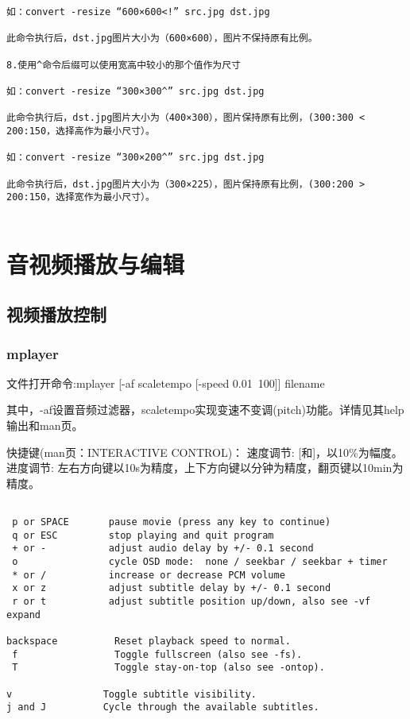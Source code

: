 \begin{verbatim}
如：convert -resize “600×600<!” src.jpg dst.jpg

此命令执行后，dst.jpg图片大小为（600×600），图片不保持原有比例。

8.使用^命令后缀可以使用宽高中较小的那个值作为尺寸

如：convert -resize “300×300^” src.jpg dst.jpg

此命令执行后，dst.jpg图片大小为（400×300），图片保持原有比例，(300:300 < 200:150，选择高作为最小尺寸）。

如：convert -resize “300×200^” src.jpg dst.jpg

此命令执行后，dst.jpg图片大小为（300×225），图片保持原有比例，(300:200 > 200:150，选择宽作为最小尺寸）。


\end{verbatim}
\section{音视频播放与编辑}

\subsection{视频播放控制}
\subsubsection{mplayer}
文件打开命令:mplayer [-af scaletempo [-speed 0.01~100]] filename

其中，-af设置音频过滤器，scaletempo实现变速不变调(pitch)功能。详情见其help输出和man页。

快捷键(man页：INTERACTIVE CONTROL)：
速度调节: 	[和]，以10\%为幅度。
进度调节:	左右方向键以10s为精度，上下方向键以分钟为精度，翻页键以10min为精度。

\begin{verbatim}

 p or SPACE       pause movie (press any key to continue)
 q or ESC         stop playing and quit program
 + or -           adjust audio delay by +/- 0.1 second
 o                cycle OSD mode:  none / seekbar / seekbar + timer
 * or /           increase or decrease PCM volume
 x or z           adjust subtitle delay by +/- 0.1 second
 r or t           adjust subtitle position up/down, also see -vf expand

backspace          Reset playback speed to normal.
 f                 Toggle fullscreen (also see -fs).
 T                 Toggle stay-on-top (also see -ontop).

v                Toggle subtitle visibility.
j and J          Cycle through the available subtitles.
\end{verbatim}

